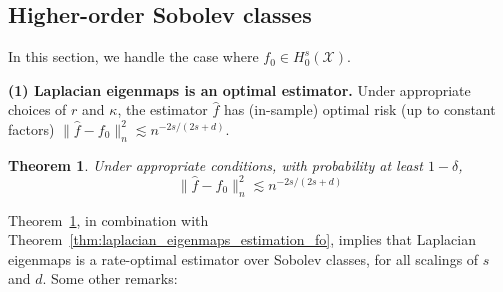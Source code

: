 \documentclass{article}
\newcommand{\1}{\mathbf{1}}
\newcommand{\mc}[1]{\mathcal{#1}}
\newcommand{\wh}[1]{\widehat{#1}}
\theoremstyle{alden}
\theoremstyle{aldenthm}
\newtheorem{theorem}{Theorem}
\theoremstyle{definition}
\theoremstyle{remark}
\begin{document}
\subsection{Higher-order Sobolev classes}
\label{sec:higher_order_sobolev_classes}
In this section, we handle the case where $f_0 \in H_0^s(\mc{X})$.

\textbf{(1) Laplacian eigenmaps is an optimal estimator.}  Under appropriate choices of $r$ and $\kappa$, the estimator $\wh{f}$ has (in-sample) optimal risk (up to constant factors) $\|\wh{f} - f_0\|_n^2 \lesssim n^{-2s/(2s + d)}$. 
\begin{theorem}
	\label{thm:laplacian_eigenmaps_estimation_ho}
	Under appropriate conditions, with probability at least $1 - \delta$,
	\begin{equation}
	\label{eqn:laplacian_eigenmaps_estimation_ho}
	\|\wh{f} - f_0\|_n^2 \lesssim n^{-2s/(2s + d)}
	\end{equation}
\end{theorem}
Theorem~\ref{thm:laplacian_eigenmaps_estimation_ho}, in combination with Theorem~\ref{thm:laplacian_eigenmaps_estimation_fo}, implies that Laplacian eigenmaps is a rate-optimal estimator over Sobolev classes, for all scalings of $s$ and $d$. Some other remarks:
\end{document}
